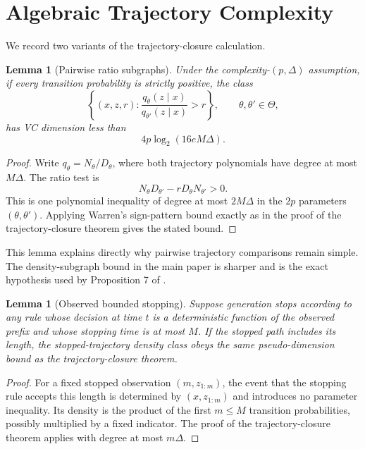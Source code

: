 \documentclass[twoside]{article}
\newtheorem{lemma}[theorem]{Lemma}
\begin{document}
\section{Algebraic Trajectory Complexity}
\label{app:algebra}

We record two variants of the trajectory-closure calculation.

\begin{lemma}[Pairwise ratio subgraphs]
\label{lem:ratio-vc}
Under the complexity-$(p,\Delta)$ assumption, if every transition probability is strictly positive, the class
\[
 \left\{(x,z,r):\frac{q_\theta(z\mid x)}{q_{\theta'}(z\mid x)}>r\right\},
 \qquad \theta,\theta'\in\Theta,
\]
has VC dimension less than
\[
 4p\log_2(16eM\Delta).
\]
\end{lemma}

\begin{proof}
Write $q_\theta=N_\theta/D_\theta$, where both trajectory polynomials have degree at most $M\Delta$. The ratio test is
\[
 N_\theta D_{\theta'}-rD_\theta N_{\theta'}>0.
\]
This is one polynomial inequality of degree at most $2M\Delta$ in the $2p$ parameters $(\theta,\theta')$. Applying Warren's sign-pattern bound exactly as in the proof of the trajectory-closure theorem gives the stated bound.
\end{proof}

This lemma explains directly why pairwise trajectory comparisons remain simple. The density-subgraph bound in the main paper is sharper and is the exact hypothesis used by Proposition 7 of \citet{baraud2018}.

\begin{lemma}[Observed bounded stopping]
\label{lem:stopping}
Suppose generation stops according to any rule whose decision at time $t$ is a deterministic function of the observed prefix and whose stopping time is at most $M$. If the stopped path includes its length, the stopped-trajectory density class obeys the same pseudo-dimension bound as the trajectory-closure theorem.
\end{lemma}

\begin{proof}
For a fixed stopped observation $(m,z_{1:m})$, the event that the stopping rule accepts this length is determined by $(x,z_{1:m})$ and introduces no parameter inequality. Its density is the product of the first $m\leq M$ transition probabilities, possibly multiplied by a fixed indicator. The proof of the trajectory-closure theorem applies with degree at most $m\Delta$.
\end{proof}
\end{document}
